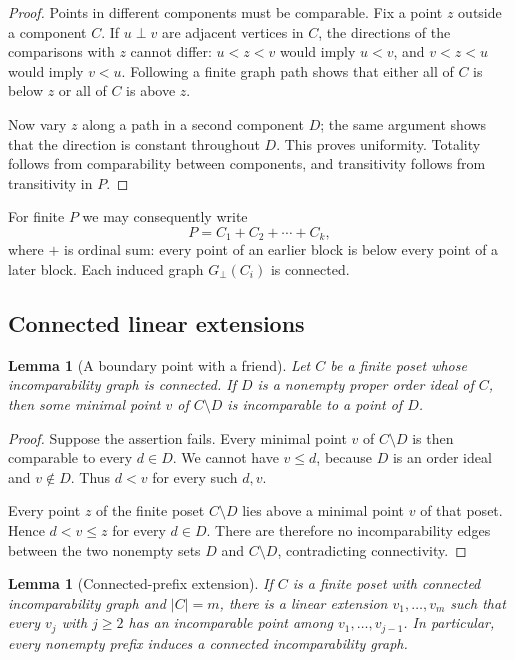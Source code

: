 \documentclass[11pt,a4paper]{article}
\newtheorem{lemma}[theorem]{Lemma}
\theoremstyle{definition}
\theoremstyle{remark}
\newcommand{\incg}{G_{\perp}}
\begin{document}
\begin{proof}
Points in different components must be comparable. Fix a point $z$ outside a
component $C$. If $u\perp v$ are adjacent vertices in $C$, the directions of
the comparisons with $z$ cannot differ: $u<z<v$ would imply $u<v$, and
$v<z<u$ would imply $v<u$. Following a finite graph path shows that either
all of $C$ is below $z$ or all of $C$ is above $z$.

Now vary $z$ along a path in a second component $D$; the same argument shows
that the direction is constant throughout $D$. This proves uniformity.
Totality follows from comparability between components, and transitivity
follows from transitivity in $P$.
\end{proof}

For finite $P$ we may consequently write
\[
 P=C_1+C_2+\cdots+C_k,
\]
where $+$ is ordinal sum: every point of an earlier block is below every
point of a later block. Each induced graph $\incg(C_i)$ is connected.

\subsection{Connected linear extensions}

\begin{lemma}[A boundary point with a friend]\label{lem:boundary}
Let $C$ be a finite poset whose incomparability graph is connected. If $D$
is a nonempty proper order ideal of $C$, then some minimal point $v$ of
$C\setminus D$ is incomparable to a point of $D$.
\end{lemma}

\begin{proof}
Suppose the assertion fails. Every minimal point $v$ of $C\setminus D$ is
then comparable to every $d\in D$. We cannot have $v\le d$, because $D$
is an order ideal and $v\notin D$. Thus $d<v$ for every such $d,v$.

Every point $z$ of the finite poset $C\setminus D$ lies above a minimal
point $v$ of that poset. Hence $d<v\le z$ for every $d\in D$. There are
therefore no incomparability edges between the two nonempty sets $D$ and
$C\setminus D$, contradicting connectivity.
\end{proof}

\begin{lemma}[Connected-prefix extension]\label{lem:extension}
If $C$ is a finite poset with connected incomparability graph and $|C|=m$,
there is a linear extension $v_1,\ldots,v_m$ such that every $v_j$ with
$j\ge2$ has an incomparable point among $v_1,\ldots,v_{j-1}$.
In particular, every nonempty prefix induces a connected incomparability
graph.
\end{lemma}
\end{document}
